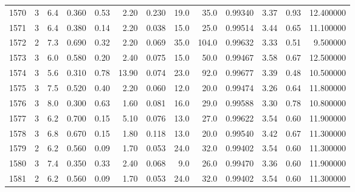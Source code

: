 \begin{tabular}{lrrrrrrrrrrrr}
1570 &        3 &            6.4 &             0.360 &         0.53 &            2.20 &      0.230 &                 19.0 &                  35.0 &  0.99340 &  3.37 &       0.93 &  12.400000 \\
1571 &        3 &            6.4 &             0.380 &         0.14 &            2.20 &      0.038 &                 15.0 &                  25.0 &  0.99514 &  3.44 &       0.65 &  11.100000 \\
1572 &        2 &            7.3 &             0.690 &         0.32 &            2.20 &      0.069 &                 35.0 &                 104.0 &  0.99632 &  3.33 &       0.51 &   9.500000 \\
1573 &        3 &            6.0 &             0.580 &         0.20 &            2.40 &      0.075 &                 15.0 &                  50.0 &  0.99467 &  3.58 &       0.67 &  12.500000 \\
1574 &        3 &            5.6 &             0.310 &         0.78 &           13.90 &      0.074 &                 23.0 &                  92.0 &  0.99677 &  3.39 &       0.48 &  10.500000 \\
1575 &        3 &            7.5 &             0.520 &         0.40 &            2.20 &      0.060 &                 12.0 &                  20.0 &  0.99474 &  3.26 &       0.64 &  11.800000 \\
1576 &        3 &            8.0 &             0.300 &         0.63 &            1.60 &      0.081 &                 16.0 &                  29.0 &  0.99588 &  3.30 &       0.78 &  10.800000 \\
1577 &        3 &            6.2 &             0.700 &         0.15 &            5.10 &      0.076 &                 13.0 &                  27.0 &  0.99622 &  3.54 &       0.60 &  11.900000 \\
1578 &        3 &            6.8 &             0.670 &         0.15 &            1.80 &      0.118 &                 13.0 &                  20.0 &  0.99540 &  3.42 &       0.67 &  11.300000 \\
1579 &        2 &            6.2 &             0.560 &         0.09 &            1.70 &      0.053 &                 24.0 &                  32.0 &  0.99402 &  3.54 &       0.60 &  11.300000 \\
1580 &        3 &            7.4 &             0.350 &         0.33 &            2.40 &      0.068 &                  9.0 &                  26.0 &  0.99470 &  3.36 &       0.60 &  11.900000 \\
1581 &        2 &            6.2 &             0.560 &         0.09 &            1.70 &      0.053 &                 24.0 &                  32.0 &  0.99402 &  3.54 &       0.60 &  11.300000 \\

\end{tabular}
